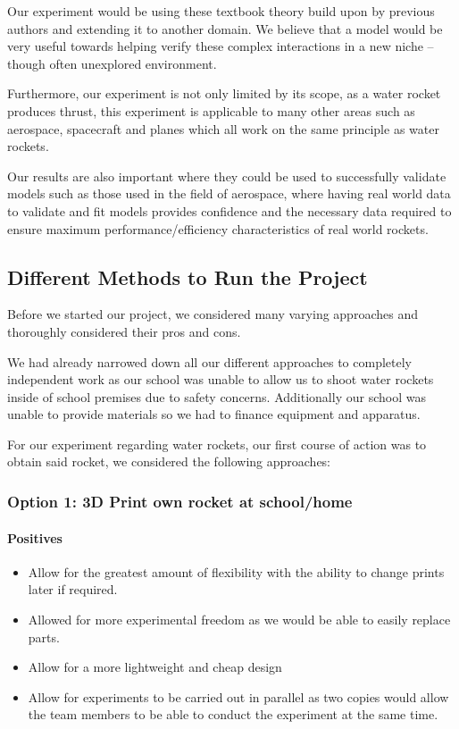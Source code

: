 \documentclass[14pt]{article}
\begin{document}
Our experiment would be using these textbook theory build upon by previous authors and extending it to another domain. We believe that a model would be very useful towards helping verify these complex interactions in a new niche -- though often unexplored environment.

Furthermore, our experiment is not only limited by its scope, as a water rocket produces thrust, this experiment is applicable to many other areas such as aerospace, spacecraft and planes which all work on the same principle as water rockets.

Our results are also important where they could be used to successfully validate models such as those used in the field of aerospace, where having real world data to validate and fit models provides confidence and the necessary data required to ensure maximum performance/efficiency characteristics of real world rockets.


\subsection{Different Methods to Run the Project}
Before we started our project, we considered many varying approaches and thoroughly considered their pros and cons.

We had already narrowed down all our different approaches to completely independent work as our school was unable to allow us to shoot water rockets inside of school premises due to safety concerns.
Additionally our school was unable to provide materials so we had to finance equipment and apparatus.

For our experiment regarding water rockets, our first course of action was to obtain said rocket, we considered the following approaches:
\subsubsection{Option 1: 3D Print own rocket at school/home}
\paragraph{Positives}
\begin{itemize}
    \item Allow for the greatest amount of flexibility with the ability to change prints later if required.
    \item Allowed for more experimental freedom as we would be able to easily replace parts.
    \item Allow for a more lightweight and cheap design
    \item Allow for experiments to be carried out in parallel as two copies would allow the team members to be able to conduct the experiment at the same time.
\end{itemize}
\end{document}
